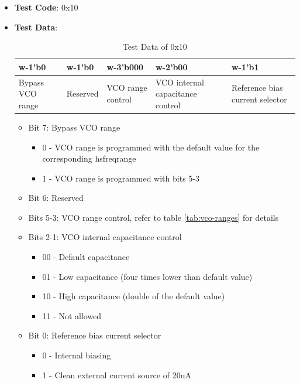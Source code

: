 \documentclass[main\_\_EN.tex]{subfiles}
\begin{document}
\begin{itemize}
    \item \textbf{Test Code}: 0x10
    \item \textbf{Test Data}: 
        \begin{longtable}{ |p{3cm}|p{3cm}|p{3cm}|p{3cm}|p{3cm}|}
            \caption{Test Data of 0x10}
            \label{tab:test-data-0x10} \\
            \hline
            \rowcolor{lightgray}
            \textbf{w-1'b0} & \textbf{w-1'b0} & \textbf{w-3'b000} & \textbf{w-2'b00} & \textbf{w-1'b1} \\ \hline
            Bypass VCO range & Reserved & VCO range control & VCO internal capacitance control & Reference bias current selector  \\ \hline
        \end{longtable}
        \begin{itemize}
            \item Bit 7: Bypass VCO range
                \begin{itemize}
                    \item 0 - VCO range is programmed with the default value for the corresponding hsfreqrange
                    \item 1 - VCO range is programmed with bits 5-3
                \end{itemize}
            \item Bit 6: Reserved
            \item Bits 5-3: VCO range control, refer to table \ref{tab:vco-ranges} for details
            \item Bits 2-1: VCO internal capacitance control
                \begin{itemize}
                    \item 00 - Default capacitance
                    \item 01 - Low capacitance (four times lower than default value)
                    \item 10 - High capacitance (double of the default value)
                    \item 11 - Not allowed
                \end{itemize}
            \item Bit 0: Reference bias current selector
                \begin{itemize}
                    \item 0 - Internal biasing
                    \item 1 - Clean external current source of 20uA

\end{itemize}
\end{itemize}
\end{itemize}
\end{document}
